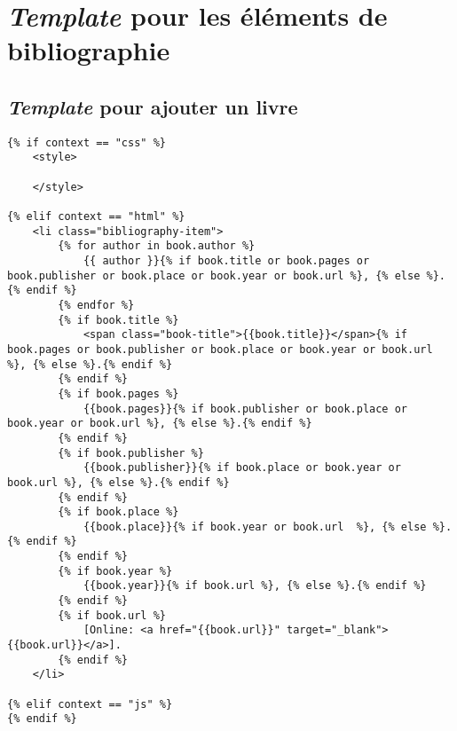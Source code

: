 \documentclass{article}
\begin{document}
\section{\textit{Template} pour les éléments de bibliographie}
\subsection{\textit{Template} pour ajouter un livre}
\begin{verbatim}
{% if context == "css" %}
    <style>

    </style>

{% elif context == "html" %}
    <li class="bibliography-item">
        {% for author in book.author %}
            {{ author }}{% if book.title or book.pages or book.publisher or book.place or book.year or book.url %}, {% else %}.{% endif %}
        {% endfor %}
        {% if book.title %}
            <span class="book-title">{{book.title}}</span>{% if book.pages or book.publisher or book.place or book.year or book.url %}, {% else %}.{% endif %}
        {% endif %}
        {% if book.pages %}
            {{book.pages}}{% if book.publisher or book.place or book.year or book.url %}, {% else %}.{% endif %}
        {% endif %}
        {% if book.publisher %}
            {{book.publisher}}{% if book.place or book.year or book.url %}, {% else %}.{% endif %}
        {% endif %}
        {% if book.place %}
            {{book.place}}{% if book.year or book.url  %}, {% else %}.{% endif %}
        {% endif %}
        {% if book.year %}
            {{book.year}}{% if book.url %}, {% else %}.{% endif %}
        {% endif %}
        {% if book.url %}
            [Online: <a href="{{book.url}}" target="_blank">{{book.url}}</a>].
        {% endif %}
    </li>

{% elif context == "js" %}
{% endif %}

\end{verbatim}
\end{document}
